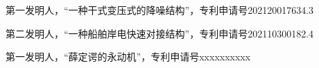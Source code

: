 \begin{patents}
	\item 第一发明人，“一种干式变压式的降噪结构”，专利申请号202120017634.3
	\item 第二发明人，“一种船舶岸电快速对接结构”，专利申请号202110300182.4
\end{patents}

\begin{patents*}
	\item 第一发明人，“薛定谔的永动机”，专利申请号xxxxxxxxxx
\end{patents*}
